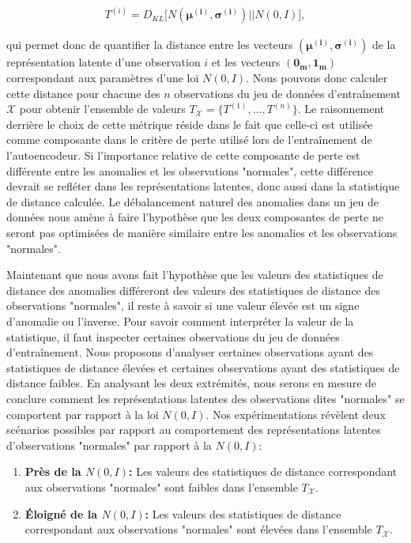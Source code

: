  \begin{gather*}  \label{eq:metrique}
 T^{(i)} = D_{KL}\big[N(\boldsymbol{\mu^{(i)}}, \boldsymbol{\sigma^{(i)}}) || N(0, I)\big],
 \end{gather*}

 qui permet donc de quantifier la distance entre les vecteurs $(\boldsymbol{\mu^{(i)}}, \boldsymbol{\sigma^{(i)}})$ de la représentation latente d'une observation $i$ et les vecteurs $(\boldsymbol{0_m}, \boldsymbol{1_m})$ correspondant aux paramètres d'une loi $N(0,I)$. Nous pouvons donc calculer cette distance pour chacune des $n$ observations du jeu de données d'entraînement $\mathcal{X}$ pour obtenir l'ensemble de valeurs $T_{\mathcal{X}}=\{T^{(1)}, ..., T^{(n)}\}$. Le raisonnement derrière le choix de cette métrique réside dans le fait que celle-ci est utilisée comme composante dans le critère de perte utilisé lors de l'entraînement de l'autoencodeur. Si l'importance relative de cette composante de perte est différente entre les anomalies et les observations "normales", cette différence devrait se refléter dans les représentations latentes, donc aussi dans la statistique de distance calculée. Le débalancement naturel des anomalies dans un jeu de données nous amène à faire l'hypothèse que les deux composantes de perte ne seront pas optimisées de manière similaire entre les anomalies et les observations "normales".

 Maintenant que nous avons fait l'hypothèse que les valeurs des statistiques de distance des anomalies différeront des valeurs des statistiques de distance des observations "normales", il reste à savoir si une valeur élevée est un signe d'anomalie ou l'inverse. Pour savoir comment interpréter la valeur de la statistique, il faut inspecter certaines observations du jeu de données d'entraînement. Nous proposons d'analyser certaines observations ayant des statistiques de distance élevées et certaines observations ayant des statistiques de distance faibles. En analysant les deux extrémités, nous serons en mesure de conclure comment les représentations latentes des observations dites "normales" se comportent par rapport à la loi $N(0,I)$. Nos expérimentations révèlent deux scénarios possibles par rapport au comportement des représentations latentes d'observations "normales" par rapport à la $N(0,I)$:

\begin{enumerate} \label{liste_scenarios}
	\item \textbf{Près de la $N(0,I)$:} Les valeurs des statistiques de distance correspondant aux observations "normales" sont faibles dans l'ensemble $T_{\mathcal{X}}$.
	\item \textbf{Éloigné de la $N(0,I)$:} Les valeurs des statistiques de distance correspondant aux observations "normales" sont élevées dans l'ensemble $T_{\mathcal{X}}$.
\end{enumerate}

